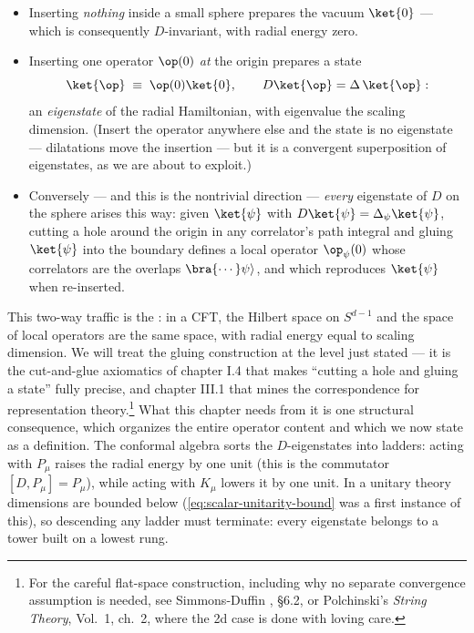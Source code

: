 \begin{itemize}
\item Inserting \emph{nothing} inside a small sphere prepares the vacuum
$\ket{0}$ --- which is consequently $D$-invariant, with radial energy zero.
\item Inserting one operator $\op(0)$ \emph{at} the origin prepares a state
\begin{equation}
\ket{\op} \;\equiv\; \op(0)\ket{0}, \qquad D\ket{\op} = \Delta\,\ket{\op}:
\label{eq:state-operator}
\end{equation}
an \emph{eigenstate} of the radial Hamiltonian, with eigenvalue the scaling
dimension. (Insert the operator anywhere else and the state is no eigenstate
--- dilatations move the insertion --- but it is a convergent superposition
of eigenstates, as we are about to exploit.)
\item Conversely --- and this is the nontrivial direction --- \emph{every}
eigenstate of $D$ on the sphere arises this way: given $\ket{\psi}$ with
$D\ket{\psi} = \Delta_\psi \ket{\psi}$, cutting a hole around the origin in
any correlator's path integral and gluing $\ket{\psi}$ into the boundary
defines a local operator $\op_\psi(0)$ whose correlators are the overlaps
$\bra{\cdots}\psi\rangle$, and which reproduces $\ket{\psi}$ when re-inserted.
\end{itemize}

\noin This two-way traffic is the : in a
CFT, the Hilbert space on $S^{d-1}$ and the space of local operators are the
same space, with radial energy equal to scaling dimension. We will treat the
gluing construction at the level just stated --- it is the cut-and-glue
axiomatics of chapter I.4 that makes ``cutting a hole and gluing a state''
fully precise, and chapter III.1 that mines the correspondence for
representation theory.\footnote{For the careful flat-space construction,
including why no separate convergence assumption is needed, see
Simmons-Duffin , \S6.2, or Polchinski's \emph{String
Theory}, Vol.\ 1, ch.\ 2, where the 2d case is done with loving care.} What
this chapter needs from it is one structural consequence, which organizes
the entire operator content and which we now state as a definition. The
conformal algebra sorts the $D$-eigenstates into ladders: acting with
$P_\mu$ raises the radial energy by one unit (this is the commutator $[D,
P_\mu] = P_\mu$), while acting with $K_\mu$ lowers it by one unit. In a
unitary theory dimensions are bounded below
(\eqref{eq:scalar-unitarity-bound} was a first instance of this), so
descending any ladder must terminate: every eigenstate belongs to a tower
built on a lowest rung.

